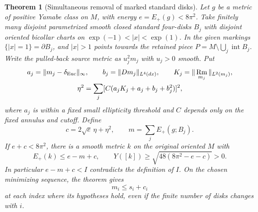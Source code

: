 \documentclass[11pt,letterpaper]{article}
\numberwithin{equation}{section}
\newtheorem{theorem}{Theorem}[section]
\theoremstyle{remark}
\DeclareMathOperator{\Rm}{Rm}
\newcommand{\Eucl}{\delta_{\rm Euc}}
\begin{document}
\begin{theorem}[Simultaneous removal of marked standard disks]\label{thm:simultaneous}
Let \(g\) be a metric of positive Yamabe class on \(M\), with energy
\(e=E_+(g)<8\pi^2\). Take finitely many disjoint parametrized smooth
closed standard four-disks \(B_j\) with disjoint oriented bicollar
charts on \(\exp(-1)<|x|<\exp(1)\). In the given markings
\(\{|x|=1\}=\partial B_j\), and \(|x|>1\) points towards the retained
piece \(P=M\setminus\bigcup_j\operatorname{int}B_j\).
Write the pulled-back source metric as \(u_j^2m_j\) with \(u_j>0\)
smooth. Put
\[
 \begin{gathered}
 a_j=\|m_j-\Eucl\|_\infty,\qquad b_j=\|Dm_j\|_{L^4(dx)},\qquad
 K_j=\|\Rm_{m_j}\|_{L^2(m_j)},\\
 \eta^2=\sum_j[C(a_jK_j+a_j+b_j+b_j^2)]^2 ,
 \end{gathered}
\]
where \(a_j\) is within a fixed small ellipticity threshold and \(C\)
depends only on the fixed annulus and cutoff. Define
\begin{equation}\label{eq:discount}
 c=2\sqrt{e}\,\eta+\eta^2,\qquad m=\sum_j E_+(g;B_j).
\end{equation}
If \(e+c<8\pi^2\), there is a smooth metric \(k\) on the original
oriented \(M\) with
\begin{equation}\label{eq:disc-bound}
 E_+(k)\le e-m+c,\qquad
 Y([k])\ge\sqrt{48(8\pi^2-e-c)}>0 .
\end{equation}
In particular \(e-m+c<I\) contradicts the definition of \(I\).
On the chosen minimizing sequence, the theorem gives
\begin{equation}\label{eq:removed}
 m_i\le s_i+c_i
\end{equation}
at each index where its hypotheses hold, even if the finite number
of disks changes with \(i\).
\end{theorem}
\end{document}
